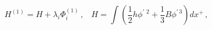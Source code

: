 \begin{equation*}
H^{\left( 1\right) }=H+\lambda _{i}\Phi _{i}^{\left( 1\right)
}\,,\;\;\;H=\int \left( \frac{1}{2}h\phi ^{\prime \,\,2}+\frac{1}{3}B\phi
^{\prime \,3}\right) dx^{+}\,,
\end{equation*}

